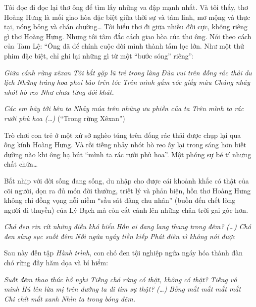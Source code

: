 \documentclass[../main.tex]{subfiles}
\begin{document}
\begin{multicols}{2}
Tôi đọc đi đọc lại thơ ông để tìm lấy những va đập mạnh nhất. Và tôi thấy, thơ Hoàng Hưng là mối giao hòa đặc biệt giữa thời sự và tâm linh, mơ mộng và thực tại, nóng bỏng và chán chường… Tôi hiểu thơ đi giữa nhiều đối cực, không riêng gì thơ Hoàng Hưng. Nhưng tôi tâm đắc cách giao hòa của thơ ông. Nói theo cách của Tam Lệ: “Ông đã để chính cuộc đời mình thành tấm lọc lớn. Như một thứ phim đặc biệt, chỉ ghi lại những gì từ một “bước sóng” riêng”:        
\begin{blockquote}
       
\textit{Giữa cánh rừng xêxan}        
\textit{Tôi bắt gặp lũ trẻ trong làng }        
\textit{Đùa vui trên đống rác thải du lịch}        
\textit{Những tràng hoa phoi bào trên tóc}        
\textit{Trên mình gấm vóc giấy màu}        
\textit{Chúng nhảy nhót hò reo} 
\textit{Như chưa từng đói khát.} 
        
\textit{Các em hãy tới bên ta}        
\textit{Nhảy múa trên những ưu phiền của ta}        
\textit{Trên mình ta rác rưởi phù hoa (…)}        
(“Trong rừng Xêxan”) 

\end{blockquote}
 
Trò chơi con trẻ ở một xứ sở nghèo túng trên đống rác thải được chụp lại qua ống kính Hoàng Hưng. Và rồi tiếng nhảy nhót hò reo ấy lại trong sáng hơn biết dường nào khi ông hạ bút “mình ta rác rưởi phù hoa”. Một phóng sự bé tí nhưng chất chứa… 
 
Bắt nhịp với đời sống đang sống, du nhập cho được cái khoảnh khắc có thật của cõi người, dọn ra đủ món đời thường, triết lý và phản biện, hồn thơ Hoàng Hưng không chỉ đồng vọng nỗi niềm “sầu sát đãng chu nhân” (buồn đến chết lòng người đi thuyền) của Lý Bạch mà còn cất cánh lên những chân trời gai góc hơn.         
\begin{blockquote}
        
\textit{Chó đen rin rít những điều khó hiểu}        
\textit{Hồn ai đang lang thang trong đêm?}        
\textit{(…)}        
\textit{Chó đen sùng sục suốt đêm}        
\textit{Nỗi ngứa ngáy tiền kiếp} 
\textit{Phát điên vì không nói được} 

\end{blockquote}
 
Sau này đến tập \textit{Hành trình, }con chó đen tội nghiệp ngứa ngáy hóa thành đàn chó rừng đầy hăm dọa và bí hiểm:        
\begin{blockquote}
        
\textit{Suốt đêm thao thức hồ nghi}        
\textit{Tiếng chó rừng có thật, không có thật?}        
\textit{Tiếng vô minh}        
\textit{Hú lên lừa mị trên đường ta đi tìm sự thật?}        
\textit{(…)}        
\textit{Bỗng mắt mắt mắt mắt}        
\textit{Chi chít mắt xanh} 
\textit{Nhìn ta trong bóng đêm.} 
 

\end{blockquote}
\end{multicols}
\end{document}
